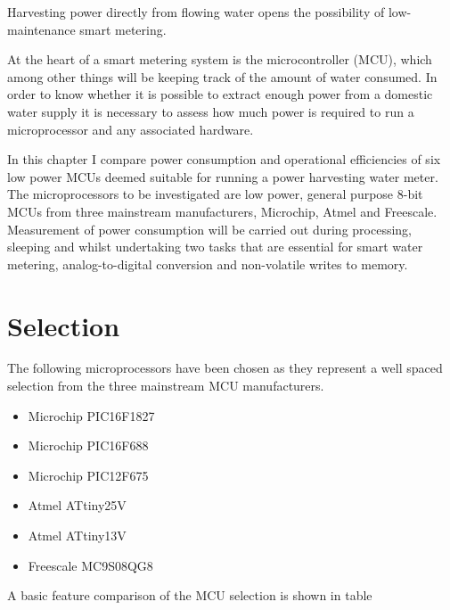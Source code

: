 
Harvesting power directly from flowing water opens the possibility of low-maintenance smart metering.


At the heart of a smart metering system is the microcontroller (MCU),
which among other things will be keeping track of the amount of water
consumed. In order to know whether it is possible to extract enough
power from a domestic water supply it is necessary to assess how much
power is required to run a microprocessor and any associated hardware.

In this chapter I compare power consumption and operational efficiencies
of six low power MCUs deemed suitable for running a power harvesting
water meter. The microprocessors to be investigated are low power,
general purpose 8-bit MCUs from three mainstream manufacturers, Microchip,
Atmel and Freescale. Measurement of power consumption will be carried
out during processing, sleeping and whilst undertaking two tasks that
are essential for smart water metering, analog-to-digital conversion
and non-volatile writes to memory.


\section{Selection}

The following microprocessors have been chosen as they represent a
well spaced selection from the three mainstream MCU manufacturers.
\begin{itemize}
\item Microchip PIC16F1827
\item Microchip PIC16F688
\item Microchip PIC12F675
\item Atmel ATtiny25V
\item Atmel ATtiny13V
\item Freescale MC9S08QG8
\end{itemize}
A basic feature comparison of the MCU selection is shown in table

